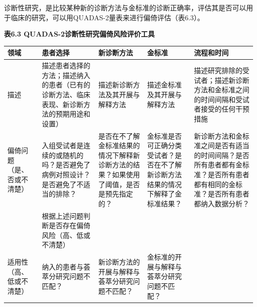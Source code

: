 \documentclass[
  chinese-hans,
  letterpaper,
  DIV=11,
  numbers=noendperiod]{scrreprt}
\newcounter{none} %
\begin{document}
诊断性研究，是比较某种新的诊断方法与金标准的诊断正确率，评估其是否可以用于临床的研究，可以用QUADAS-2量表来进行偏倚评估（表6.3）。

\textbf{表6.3 QUADAS-2诊断性研究偏倚风险评价工具}

{\def\LTcaptype{none} %
\begin{longtable}[]{@{}
  >{\raggedright\arraybackslash}p{}
  >{\raggedright\arraybackslash}p{}
  >{\raggedright\arraybackslash}p{}
  >{\raggedright\arraybackslash}p{}
  >{\raggedright\arraybackslash}p{}@{}}
\toprule\noalign{}
\begin{minipage}[b]{\linewidth}\raggedright
领域
\end{minipage} & \begin{minipage}[b]{\linewidth}\raggedright
患者选择
\end{minipage} & \begin{minipage}[b]{\linewidth}\raggedright
新诊断方法
\end{minipage} & \begin{minipage}[b]{\linewidth}\raggedright
金标准
\end{minipage} & \begin{minipage}[b]{\linewidth}\raggedright
流程和时间
\end{minipage} \\
\midrule\noalign{}
\endhead
\bottomrule\noalign{}
\endlastfoot
描述 &
描述患者选择的方法；描述纳入的患者（已有的诊断方法、临床表现、新诊断方法的预期用途和设置）
& 描述新诊断方法及其开展与解释方法 & 描述金标准及其开展与解释方法 &
描述研究排除的受试者；描述新诊断方法和金标准之间的时间间隔和受试者接受的任何干预措施 \\
偏倚问题（是、否或不清楚） &
入组受试者是连续的或随机的吗？是否避免了病例对照设计？是否避免了不适当的排除？
&
是否在不了解金标准结果的情况下解释新诊断方法的结果？如果使用了阈值，是否是预先指定的？
&
金标准是否可正确分类受试者？是否在不了解新诊断方法结果的情况下解释了金标准结果？
&
新诊断方法和金标准之间是否有适当的时间间隔？是否所有患者都有金标准？是否所有患者都有相同的金标准？是否所有患者都纳入数据分析？ \\
& 根据上述问题判断是否存在偏倚风险（高、低或不清楚） & & & \\
适用性（高、低或不清楚） & 纳入的患者与荟萃分研究问题不匹配？ &
新诊断方法的开展与解释与荟萃分研究问题不匹配？ &
金标准的开展与解释与荟萃分研究问题不匹配？ & \\
\end{longtable}
}
\end{document}
